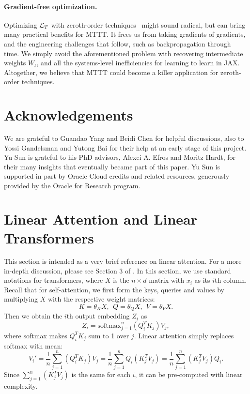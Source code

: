 \documentclass{article} %
\begin{document}
\paragraph{Gradient-free optimization.} Optimizing $\mathcal{L}_T$ with zeroth-order techniques~\citep{salimans2017evolution, hinton2022forward, malladi2023fine} might sound radical, but can bring many practical benefits for MTTT.
It frees us from taking gradients of gradients, and the engineering challenges that follow, such as backpropagation through time.
We simply avoid the aforementioned problem with recovering intermediate weights $W_t$, and all the systems-level inefficiencies for learning to learn in JAX.
Altogether, we believe that MTTT could become a killer application for zeroth-order techniques. 

\section*{Acknowledgements}
We are grateful to Guandao Yang and Beidi Chen for helpful discussions, also to Yossi Gandelsman and Yutong Bai for their help at an early stage of this project.
Yu Sun is grateful to his PhD advisors, Alexei A. Efros and Moritz Hardt, for their many insights that eventually became part of this paper.
Yu Sun is supported in part by Oracle Cloud credits and related resources, generously provided by the Oracle for Research program. 




\appendix

\clearpage

\section{Linear Attention and Linear Transformers}
\label{app:linear-attention}
This section is intended as a very brief reference on linear attention. 
For a more in-depth discussion, please see Section 3 of \cite{katharopoulos2020transformers}.
In this section, we use standard notations for transformers, where $X$ is the $n\times d$ matrix with $x_i$ as its $i$th column.
Recall that for self-attention, we first form the keys, queries and values by multiplying $X$ with the respective weight matrices:
\begin{equation}
\label{eq:kqv}
K = \theta_K X, ~~Q = \theta_Q X, ~~V = \theta_V X.
\end{equation}
Then we obtain the $i$th output embedding $Z_i$ as
\begin{equation}
Z_i = \text{softmax}_{j=1}^n \left( Q_i^T K_j \right) V_j,
\end{equation}
where softmax makes $Q_i^T K_j$ sum to 1 over $j$.
Linear attention simply replaces softmax with mean:
\begin{equation}
\label{eq:linear-attention}
V_i' 
= \frac{1}{n}\sum_{j=1}^n \left( Q_i^T K_j \right) V_j
= \frac{1}{n}\sum_{j=1}^n Q_i \left( K_j^T V_j \right)
= \frac{1}{n}\sum_{j=1}^n \left( K_j^T V_j \right) Q_i.
\end{equation}
Since $\sum_{j=1}^n \left( K_j^T V_j \right)$ is the same for each $i$, it can be pre-computed with linear complexity.
\end{document}
